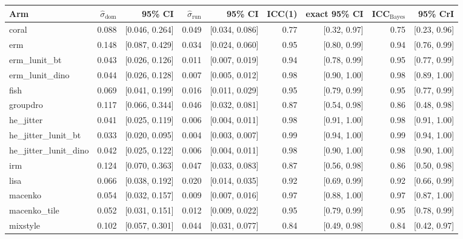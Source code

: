 \begin{tabular}{lrrrrrrrr}
\toprule
Arm & $\hat\sigma_\text{dom}$ & 95\% CI & $\hat\sigma_\text{run}$ & 95\% CI & ICC(1) & exact 95\% CI & ICC$_\text{Bayes}$ & 95\% CrI \\
\midrule
coral & 0.088 & [0.046, 0.264] & 0.049 & [0.034, 0.086] & 0.77 & [0.32, 0.97] & 0.75 & [0.23, 0.96] \\
erm & 0.148 & [0.087, 0.429] & 0.034 & [0.024, 0.060] & 0.95 & [0.80, 0.99] & 0.94 & [0.76, 0.99] \\
erm\_lunit\_bt & 0.043 & [0.026, 0.126] & 0.011 & [0.007, 0.019] & 0.94 & [0.78, 0.99] & 0.95 & [0.77, 0.99] \\
erm\_lunit\_dino & 0.044 & [0.026, 0.128] & 0.007 & [0.005, 0.012] & 0.98 & [0.90, 1.00] & 0.98 & [0.89, 1.00] \\
fish & 0.069 & [0.041, 0.199] & 0.016 & [0.011, 0.029] & 0.95 & [0.79, 0.99] & 0.95 & [0.77, 0.99] \\
groupdro & 0.117 & [0.066, 0.344] & 0.046 & [0.032, 0.081] & 0.87 & [0.54, 0.98] & 0.86 & [0.48, 0.98] \\
he\_jitter & 0.041 & [0.025, 0.119] & 0.006 & [0.004, 0.011] & 0.98 & [0.91, 1.00] & 0.98 & [0.91, 1.00] \\
he\_jitter\_lunit\_bt & 0.033 & [0.020, 0.095] & 0.004 & [0.003, 0.007] & 0.99 & [0.94, 1.00] & 0.99 & [0.94, 1.00] \\
he\_jitter\_lunit\_dino & 0.042 & [0.025, 0.122] & 0.006 & [0.004, 0.011] & 0.98 & [0.90, 1.00] & 0.98 & [0.90, 1.00] \\
irm & 0.124 & [0.070, 0.363] & 0.047 & [0.033, 0.083] & 0.87 & [0.56, 0.98] & 0.86 & [0.50, 0.98] \\
lisa & 0.066 & [0.038, 0.192] & 0.020 & [0.014, 0.035] & 0.92 & [0.69, 0.99] & 0.92 & [0.66, 0.99] \\
macenko & 0.054 & [0.032, 0.157] & 0.009 & [0.007, 0.016] & 0.97 & [0.88, 1.00] & 0.97 & [0.87, 1.00] \\
macenko\_tile & 0.052 & [0.031, 0.151] & 0.012 & [0.009, 0.022] & 0.95 & [0.79, 0.99] & 0.95 & [0.78, 0.99] \\
mixstyle & 0.102 & [0.057, 0.301] & 0.044 & [0.031, 0.077] & 0.84 & [0.49, 0.98] & 0.84 & [0.42, 0.97] \\

\end{tabular}
